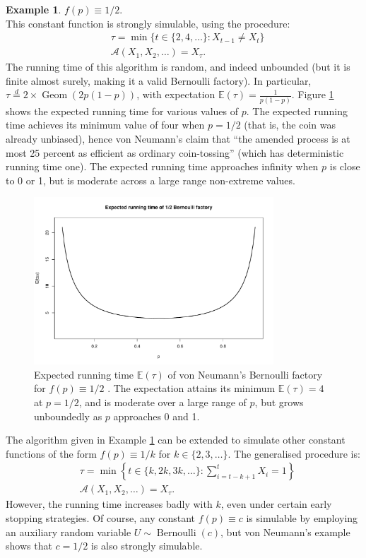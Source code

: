 \documentclass{article}
\theoremstyle{definition}
\newtheorem{example}{Example}
\newcommand{\E}{\mathbb{E}}
\newcommand{\eqdist}{\overset{d}{=}}
\newcommand{\Bern}{\operatorname{Bernoulli}}
\newcommand{\Geom}{\operatorname{Geom}}
\newcommand{\A}{\mathcal{A}}
\begin{document}
\begin{example}\label{ex:const_half}
$f(p) \equiv 1/2$.\\
This constant function is strongly simulable, using the procedure:
\begin{align*}
& \tau = \min\{ t \in \{2,4,\dots\} : X_{t-1} \neq X_t \} \\
& \A(X_1,X_2,\dots) = X_\tau.
\end{align*}
The running time of this algorithm is random, and indeed unbounded (but it is finite almost surely, making it a valid Bernoulli factory). In particular, $\tau \eqdist 2\times\Geom(2p(1-p))$, with expectation $\E(\tau) = \frac{1}{p(1-p)}$. Figure \ref{fig:runtime_const2} shows the expected running time for various values of $p$. The expected running time achieves its minimum value of four when $p=1/2$ (that is, the coin was already unbiased), hence von Neumann's claim that ``the amended process is at most 25 percent as efficient as ordinary coin-tossing'' (which has deterministic running time one). The expected running time approaches infinity when $p$ is close to 0 or 1, but is moderate across a large range non-extreme values.
\begin{figure}
\centering
\includegraphics[width=0.8\textwidth]{vonneu_runtime.pdf}
\caption{Expected running time $\E(\tau)$ of von Neumann's Bernoulli factory for $f(p)\equiv 1/2$ \citep{vonneumann1951}.  The expectation attains its minimum $\E(\tau)=4$ at $p=1/2$, and is moderate over a large range of $p$, but grows unboundedly as $p$ approaches 0 and 1.}
\label{fig:runtime_const2}
\end{figure}
\end{example}

The algorithm given in Example \ref{ex:const_half} can be extended to simulate other constant functions of the form $f(p)\equiv 1/k$ for $k\in \{2,3,\dots\}$. The generalised procedure is:
\begin{align*}
& \tau = \min\left\{ t \in \{k,2k,3k,\dots\} : \sum_{i=t-k+1}^t X_{i} = 1 \right\} \\
& \A(X_1,X_2,\dots) = X_\tau.
\end{align*}
However, the running time increases badly with $k$, even under certain early stopping strategies.
Of course, any constant $f(p)\equiv c$ is simulable by employing an auxiliary random variable $U\sim \Bern(c)$, but von Neumann's example shows that $c=1/2$ is also strongly simulable.
\end{document}
